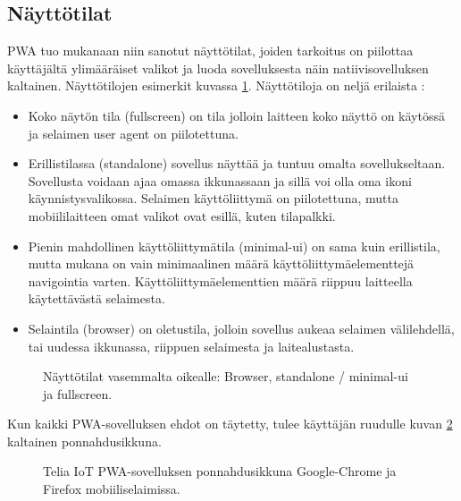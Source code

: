 \documentclass{tktltiki}
\begin{document}
\subsection{Näyttötilat}

PWA tuo mukanaan niin sanotut näyttötilat, joiden tarkoitus on piilottaa käyttäjältä ylimääräiset valikot ja luoda sovelluksesta näin natiivisovelluksen kaltainen. Näyttötilojen esimerkit kuvassa \ref{Näyttötilat}. Näyttötiloja on neljä erilaista \cite{Mozilla}:

\begin{itemize}
  \item Koko näytön tila (fullscreen) on tila jolloin laitteen koko näyttö on käytössä ja selaimen user agent on piilotettuna.
  \item Erillistilassa (standalone) sovellus näyttää ja tuntuu omalta sovellukseltaan. Sovellusta voidaan ajaa omassa ikkunassaan ja sillä voi olla oma ikoni käynnistysvalikossa. Selaimen käyttöliittymä on piilotettuna, mutta mobiililaitteen omat valikot ovat esillä, kuten tilapalkki. 
  \item Pienin mahdollinen käyttöliittymätila (minimal-ui) on sama kuin erillistila, mutta mukana on vain minimaalinen määrä käyttöliittymäelementtejä navigointia varten. Käyttöliittymäelementtien määrä riippuu laitteella käytettävästä selaimesta. 
  \item Selaintila (browser) on oletustila, jolloin sovellus aukeaa selaimen välilehdellä, tai uudessa ikkunassa, riippuen selaimesta ja laitealustasta. 
\end{itemize}

\begin{figure}[h]
\begin{center}
\caption{Näyttötilat vasemmalta oikealle: Browser, standalone / minimal-ui ja fullscreen.}
\label{Näyttötilat}
\end{center}
\end{figure}

Kun kaikki PWA-sovelluksen ehdot on täytetty, tulee käyttäjän ruudulle kuvan \ref{asennusbanneri} kaltainen ponnahdusikkuna.

\begin{figure}[h]
\begin{center}
\caption{Telia IoT PWA-sovelluksen ponnahdusikkuna Google-Chrome ja Firefox mobiiliselaimissa.}
\label{asennusbanneri}
\end{center}
\end{figure}
\end{document}
